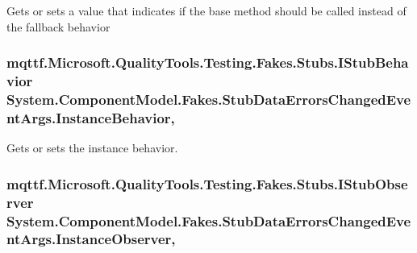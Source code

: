 Gets or sets a value that indicates if the base method should be called instead of the fallback behavior

\hypertarget{class_system_1_1_component_model_1_1_fakes_1_1_stub_data_errors_changed_event_args_aadc3a79ef1e32d12987100388fb441f6}{
\subsubsection[{Instance\-Behavior}]{\setlength{\rightskip}{0pt plus 5cm}mqttf.\-Microsoft.\-Quality\-Tools.\-Testing.\-Fakes.\-Stubs.\-I\-Stub\-Behavior System.\-Component\-Model.\-Fakes.\-Stub\-Data\-Errors\-Changed\-Event\-Args.\-Instance\-Behavior\hspace{0.3cm}{\ttfamily [get]}, {\ttfamily [set]}}}\label{class_system_1_1_component_model_1_1_fakes_1_1_stub_data_errors_changed_event_args_aadc3a79ef1e32d12987100388fb441f6}


Gets or sets the instance behavior.

\hypertarget{class_system_1_1_component_model_1_1_fakes_1_1_stub_data_errors_changed_event_args_ae677ca2f340cf9914d2ab8a333b76d3d}{
\subsubsection[{Instance\-Observer}]{\setlength{\rightskip}{0pt plus 5cm}mqttf.\-Microsoft.\-Quality\-Tools.\-Testing.\-Fakes.\-Stubs.\-I\-Stub\-Observer System.\-Component\-Model.\-Fakes.\-Stub\-Data\-Errors\-Changed\-Event\-Args.\-Instance\-Observer\hspace{0.3cm}{\ttfamily [get]}, {\ttfamily [set]}}}\label{class_system_1_1_component_model_1_1_fakes_1_1_stub_data_errors_changed_event_args_ae677ca2f340cf9914d2ab8a333b76d3d}


